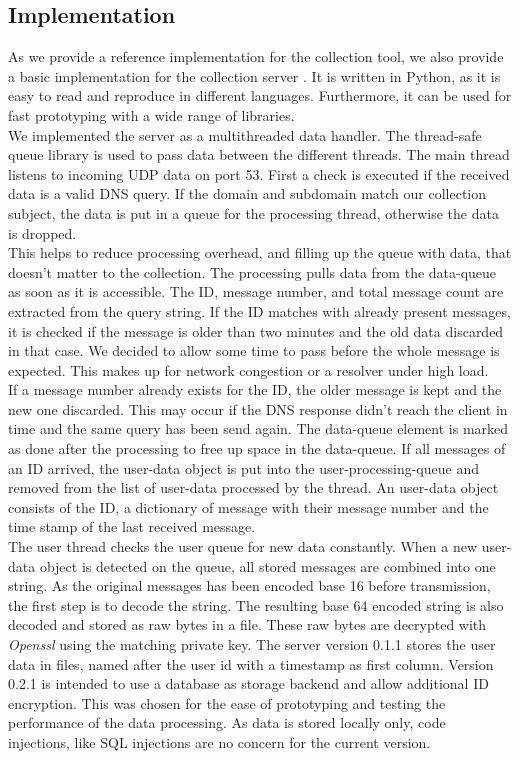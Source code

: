     \subsection{Implementation}
        \label{subsec:measure:implementation}
        As we provide a reference implementation for the collection tool, we also provide a basic implementation for the collection server \cite{venz_ikstreamdns-handler_2021}. It is written in Python, as it is easy to read and reproduce in different languages. Furthermore, it can be used for fast prototyping with a wide range of libraries.\\
        We implemented the server as a multithreaded data handler. The thread-safe queue library is used to pass data between the different threads. The main thread listens to incoming UDP data on port 53. First a check is executed if the received data is a valid DNS query. If the domain and subdomain match our collection subject, the data is put in a queue for the processing thread, otherwise the data is dropped.\\
        This helps to reduce processing overhead, and filling up the queue with data, that doesn't matter to the collection.
        The processing pulls data from the data-queue as soon as it is accessible. The ID, message number, and total message count are extracted from the query string. 
        If the ID matches with already present messages, it is checked if the message is older than two minutes and the old data discarded in that case. We decided to allow some time to pass before the whole message is expected. This makes up for network congestion or a resolver under high load.\\
        If a message number already exists for the ID, the older message is kept and the new one discarded. This may occur if the DNS response didn't reach the client in time and the same query has been send again. The data-queue element is marked as done after the processing to free up space in the data-queue. If all messages of an ID arrived, the user-data object is put into the user-processing-queue and removed from the list of user-data processed by the thread.
        An user-data object consists of the ID, a dictionary of message with their message number and the time stamp of the last received message.\\
        The user thread checks the user queue for new data constantly. When a new user-data object is detected on the queue, all stored messages are combined into one string.
        As the original messages has been encoded base 16 before transmission, the first step is to decode the string. The resulting base 64 encoded string is also decoded and stored as raw bytes in a file. These raw bytes are decrypted with \textit{Openssl} using the matching private key. 
        The server version 0.1.1 stores the user data in files, named after the user id with a timestamp as first column. Version 0.2.1 is intended to use a database as storage backend and allow additional ID encryption. This was chosen for the ease of prototyping and testing the performance of the data processing.
        As data is stored locally only, code injections, like SQL injections are no concern for the current version. 

